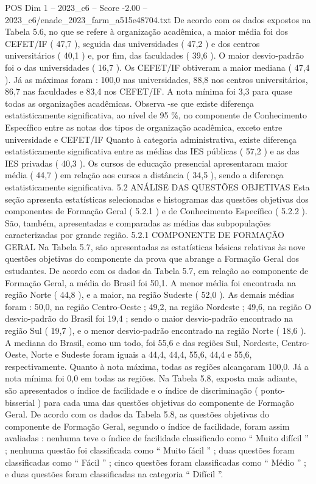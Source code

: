 \begin{textsample}{POS Dim 1 – 2023\_c6 – Score -2.00 – 2023\_c6/enade\_2023\_farm\_a515e48704.txt}
De acordo com os dados expostos na Tabela 5.6, no que se refere à organização acadêmica, a maior média foi dos CEFET/IF ( 47,7 ), seguida das universidades ( 47,2 ) e dos centros universitários ( 40,1 ) e, por fim, das faculdades ( 39,6 ).
O maior desvio-padrão foi o das universidades ( 16,7 ).
Os CEFET/IF obtiveram a maior mediana ( 47,4 ).
Já as máximas foram : 100,0 nas universidades, 88,8 nos centros universitários, 86,7 nas faculdades e 83,4 nos CEFET/IF.
A nota mínima foi 3,3 para quase todas as organizações acadêmicas.
Observa -se que existe diferença estatisticamente significativa, ao nível de 95 \%, no componente de Conhecimento Específico entre as notas dos tipos de organização acadêmica, exceto entre universidade e CEFET/IF Quanto à categoria administrativa, existe diferença estatisticamente significativa entre as médias das IES públicas ( 57,2 ) e as das IES privadas ( 40,3 ).
Os cursos de educação presencial apresentaram maior média ( 44,7 ) em relação aos cursos a distância ( 34,5 ), sendo a diferença estatisticamente significativa. 5.2 ANÁLISE DAS QUESTÕES OBJETIVAS Esta seção apresenta estatísticas selecionadas e histogramas das questões objetivas dos componentes de Formação Geral ( 5.2.1 ) e de Conhecimento Específico ( 5.2.2 ).
São, também, apresentadas e comparadas as médias das subpopulações caracterizadas por grande região. 5.2.1 COMPONENTE DE FORMAÇÃO GERAL Na Tabela 5.7, são apresentadas as estatísticas básicas relativas às nove questões objetivas do componente da prova que abrange a Formação Geral dos estudantes.
De acordo com os dados da Tabela 5.7, em relação ao componente de Formação Geral, a média do Brasil foi 50,1.
A menor média foi encontrada na região Norte ( 44,8 ), e a maior, na região Sudeste ( 52,0 ).
As demais médias foram : 50,0, na região Centro-Oeste ; 49,2, na região Nordeste ; 49,6, na região O desvio-padrão do Brasil foi 19,4 ; sendo o maior desvio-padrão encontrado na região Sul ( 19,7 ), e o menor desvio-padrão encontrado na região Norte ( 18,6 ).
A mediana do Brasil, como um todo, foi 55,6 e das regiões Sul, Nordeste, Centro-Oeste, Norte e Sudeste foram iguais a 44,4, 44,4, 55,6, 44,4 e 55,6, respectivamente.
Quanto à nota máxima, todas as regiões alcançaram 100,0.
Já a nota mínima foi 0,0 em todas as regiões.
Na Tabela 5.8, exposta mais adiante, são apresentados o índice de facilidade e o índice de discriminação ( ponto-bisserial ) para cada uma das questões objetivas do componente de Formação Geral.
De acordo com os dados da Tabela 5.8, as questões objetivas do componente de Formação Geral, segundo o índice de facilidade, foram assim avaliadas : nenhuma teve o índice de facilidade classificado como “ Muito difícil ” ; nenhuma questão foi classificada como “ Muito fácil ” ; duas questões foram classificadas como “ Fácil ” ; cinco questões foram classificadas como “ Médio ” ; e duas questões foram classificadas na categoria “ Difícil ”.

\end{textsample}
